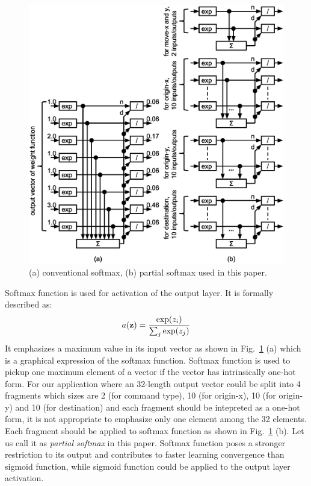 \documentclass[twocolumn]{article}
\begin{document}
\begin{figure}[!tp]
 \begin{center}
  \begin{minipage}{\hsize}
   \includegraphics[width=\hsize]{fig/partial_softmax_06.eps}
   \caption{(a) conventional softmax, (b) partial softmax used in this paper.}
   \label{fig:partial_softmax}
  \end{minipage}
 \end{center}
\end{figure}

Softmax function is used for activation of the output layer.
It is formally described as:
\begin{eqnarray}
a({\bf z}) = \frac{\exp(z_i)}{\sum_j \exp(z_j)}
\end{eqnarray}
It emphasizes a maximum value in its input vector
as shown in Fig.\ \ref{fig:partial_softmax} (a)
which is a graphical expression of the softmax function.
Softmax function is used to pickup one maximum element of a vector
if the vector has intrinsically one-hot form.
For our application where an 32-length output vector could be split
into 4 fragments which sizes are
2 (for command type), 10 (for origin-x), 10 (for origin-y)
and 10 (for destination)
and each fragment should be intepreted as a one-hot form,
it is not appropriate to emphasize only one element among the 32 elements.
Each fragment should be applied to softmax function
as shown in Fig.\ \ref{fig:partial_softmax} (b).
Let us call it as {\it partial softmax} in this paper.
Softmax function poses a stronger restriction to its output
and contributes to faster learning convergence than sigmoid function,
while sigmoid function could be applied to the output layer activation.
\end{document}
